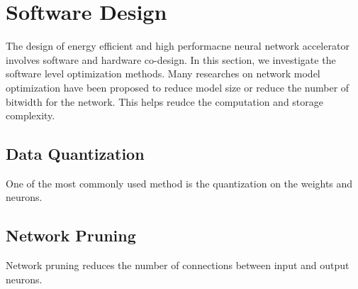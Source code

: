 \section{Software Design}

The design of energy efficient and high performacne neural network accelerator involves software and hardware co-design. In this section, we investigate the software level optimization methods. Many researches on network model optimization have been proposed to reduce model size or reduce the number of bitwidth for the network. This helps reudce the computation and storage complexity.

\subsection{Data Quantization}
One of the most commonly used method is the quantization on the weights and neurons. 

\subsection{Network Pruning}
Network pruning reduces the number of connections between input and output neurons. 